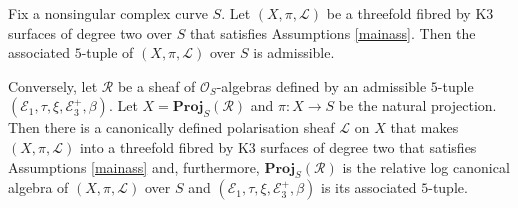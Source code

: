 \documentclass{amsart}
\begin{document}
\begin{thm} \label{relmodthm} Fix a nonsingular complex curve $S$. Let $(X,\pi,{\mathcal{L}})$ be a threefold fibred by K3 surfaces of degree two over $S$ that satisfies Assumptions \ref{mainass}. Then the associated $5$-tuple of $(X,\pi,{\mathcal{L}})$ over $S$ is admissible.

Conversely, let ${\mathcal{R}}$ be a sheaf of ${\mathcal{O}}_S$-algebras defined by an admissible $5$-tuple $({\mathcal{E}}_1,\tau,\xi,{\mathcal{E}}_3^+,\beta)$. Let $X = \mathbf{Proj}_S({\mathcal{R}})$ and $\pi\colon X \to S$ be the natural projection. Then there is a canonically defined polarisation sheaf ${\mathcal{L}}$ on $X$ that makes $(X,\pi,{\mathcal{L}})$ into a threefold fibred by K3 surfaces of degree two that satisfies Assumptions \ref{mainass} and, furthermore, $\mathbf{Proj}_S({\mathcal{R}})$ is the relative log canonical algebra of $(X,\pi,{\mathcal{L}})$ over $S$ and $({\mathcal{E}}_1,\tau,\xi,{\mathcal{E}}_3^+,\beta)$ is its associated $5$-tuple.
\end{thm}
\end{document}
